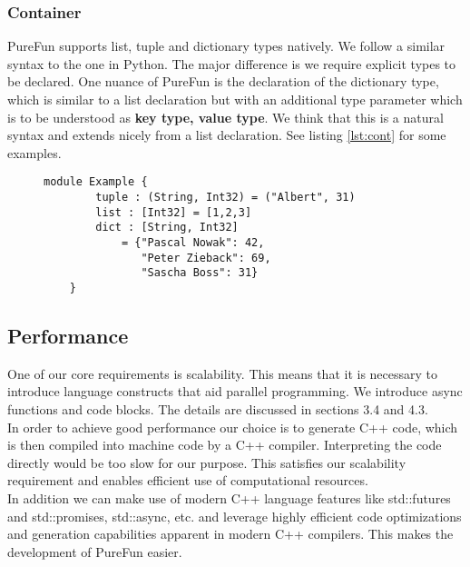 \subsubsection{Container} PureFun supports list, tuple and dictionary types natively. We follow a similar syntax to the one in Python. The major difference is we require explicit types to be declared. One nuance of PureFun is the declaration of the dictionary type, which is similar to a list declaration but with an additional type parameter which is to be understood as \textbf{key type, value type}. We think that this is a natural syntax and extends nicely from a list declaration. See listing \ref{lst:cont} for some examples.

\begin{figure}
	\begin{lstlisting}[caption={Some examples of container types supported in PureFun.},label={lst:cont}]
	module Example {
		tuple : (String, Int32) = ("Albert", 31)
		list : [Int32] = [1,2,3]
		dict : [String, Int32] 
			= {"Pascal Nowak": 42,
			   "Peter Zieback": 69,
			   "Sascha Boss": 31}
	}
	\end{lstlisting}
\end{figure}

\subsection{Performance}
One of our core requirements is scalability. This means that it is necessary to introduce language constructs that aid parallel programming. We introduce async functions and code blocks. The details are discussed in sections 3.4 and 4.3.\\
In order to achieve good performance our choice is to generate C++ code, which is then compiled into machine code by a C++ compiler. Interpreting the code directly would be too slow for our purpose. This satisfies our scalability requirement and enables efficient use of computational resources.\\
In addition we can make use of modern C++ language features like std::futures and std::promises, std::async, etc. and leverage highly efficient code optimizations and generation capabilities apparent in modern C++ compilers. This makes the development of PureFun easier.
